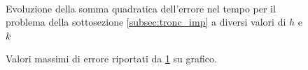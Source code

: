 \documentclass[10pt,a4paper]{article}
\begin{document}
\begin{figure}
	\\
	\caption{Evoluzione della somma quadratica dell'errore nel tempo per il problema della sottosezione \ref{subsec:tronc_imp} a diversi valori di $h$ e $k$}
	\label{fig:troncamento_implicito}
\end{figure}

\begin{figure}
	\centering
	\quad
	\caption{Valori massimi di errore riportati da \ref{fig:troncamento_implicito} su grafico.}
	\label{fig:implicito}
\end{figure}
\end{document}
